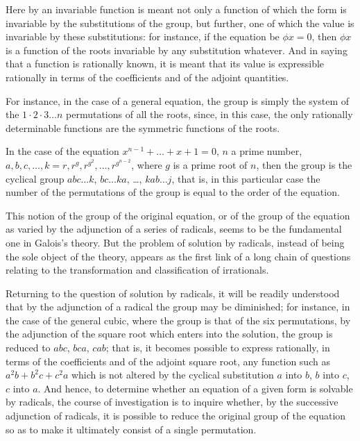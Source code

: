 \documentclass[11pt,a4paper]{book}
\begin{document}
Here by an invariable function is meant not only a function of which the form is invariable by the substitutions of the group, but further, one of which the value is invariable by these substitutions: for instance, if the equation be $\phi x = 0$, then $\phi x$ is a function of the roots invariable by any substitution whatever. And in saying that a function is rationally known, it is meant that its value is expressible rationally in terms of the coefficients and of the adjoint quantities.

For instance, in the case of a general equation, the group is simply the system of the $1 \cdot 2 \cdot 3 \ldots n$ permutations of all the roots, since, in this case, the only rationally determinable functions are the symmetric functions of the roots.

In the case of the equation $x^{n-1} + \ldots + x + 1 = 0$, $n$ a prime number, $a, b, c, \ldots, k = r, r^{g}, r^{g^{2}}, \ldots, r^{g^{n-2}}$, where $g$ is a prime root of $n$, then the group is the cyclical group $abc\ldots k$, $bc\ldots ka$, \ldots, $kab\ldots j$, that is, in this particular case the number of the permutations of the group is equal to the order of the equation.

This notion of the group of the original equation, or of the group of the equation as varied by the adjunction of a series of radicals, seems to be the fundamental one in Galois's theory. But the problem of solution by radicals, instead of being the sole object of the theory, appears as the first link of a long chain of questions relating to the transformation and classification of irrationals.

Returning to the question of solution by radicals, it will be readily understood that by the adjunction of a radical the group may be diminished; for instance, in the case of the general cubic, where the group is that of the six permutations, by the adjunction of the square root which enters into the solution, the group is reduced to $abc$, $bca$, $cab$; that is, it becomes possible to express rationally, in terms of the coefficients and of the adjoint square root, any function such as $a^{2}b + b^{2}c + c^{2}a$ which is not altered by the cyclical substitution $a$ into $b$, $b$ into $c$, $c$ into $a$. And hence, to determine whether an equation of a given form is solvable by radicals, the course of investigation is to inquire whether, by the successive adjunction of radicals, it is possible to reduce the original group of the equation so as to make it ultimately consist of a single permutation.
\end{document}
